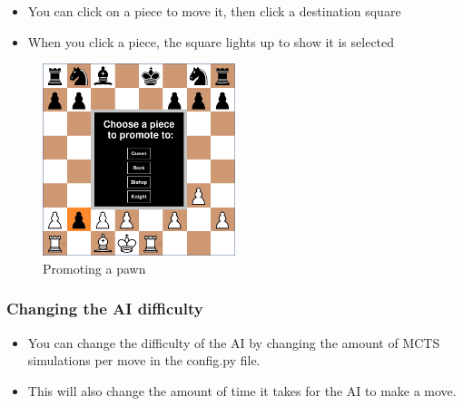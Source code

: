 \documentclass{article}
\begin{document}
\begin{itemize}
    \item You can click on a piece to move it, then click a destination square
    \item When you click a piece, the square lights up to show it is selected 
\end{itemize}

\begin{figure}[H]
    \centering
    \includegraphics[width=0.5\textwidth]{img/chessboard-promotion.png}
    \caption{Promoting a pawn}
\end{figure}

\subsubsection{Changing the AI difficulty}

\begin{itemize}
    \item You can change the difficulty of the AI by changing the amount of MCTS simulations per move in the config.py file.
    \item This will also change the amount of time it takes for the AI to make a move.
\end{itemize}

\end{document}
